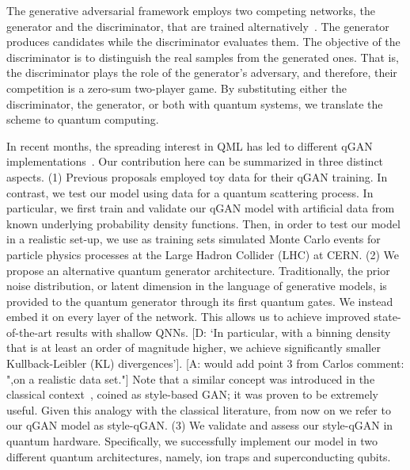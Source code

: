 \documentclass[twocolumn,preprintnumbers,superscriptaddress]{revtex4-2}
\newcommand{\commentAF}[1]{{\color{cyan} {[A: #1]}}}
\newcommand{\commentDMG}[1]{{\color{orange} {[D: #1]}}}
\begin{document}
The generative adversarial framework employs two competing networks, the generator and the discriminator, that are
trained alternatively~\cite{goodfellow2014generative}. The generator produces candidates
while the discriminator evaluates them. The objective of the discriminator is to
distinguish the real samples from the generated ones. That is, the discriminator
plays the role of the generator's adversary, and therefore, their competition is
a zero-sum two-player game. By substituting either the discriminator, the
generator, or both with quantum systems, we translate the scheme to quantum
computing.

In recent months, the spreading interest in QML has led to different qGAN
implementations~\cite{zoufal2019quantum, zeng2019learning, situ2020quantum, hu2019quantum, benedetti2019adversarial, romero2021variational, niu2021entangling}. Our contribution here can be summarized in three distinct aspects. (1) Previous proposals employed toy data for their qGAN training. In contrast, we test our model using data for a quantum scattering process. In particular, we first train and validate our qGAN model with artificial data from known underlying probability density functions. Then, in order to test our model in a realistic set-up, we use as training sets simulated Monte Carlo events for particle physics processes at the Large Hadron Collider (LHC) at CERN. (2) We propose an alternative quantum generator architecture. Traditionally, the prior noise distribution, or latent dimension in the language of generative models, is provided to the quantum generator through its first quantum gates. We instead embed it on every layer of the network. This allows us to achieve improved state-of-the-art results with shallow QNNs. \commentDMG{`In particular, with a binning density that is at least an order of magnitude higher, we achieve significantly smaller Kullback-Leibler (KL) divergences'}.\commentAF{would add point 3 from Carlos comment: ",on a realistic data set."} Note that a similar concept was introduced in the classical context~\cite{karras2019style}, coined as style-based GAN; it was proven to be extremely useful. Given this analogy with the classical literature, from now on we refer to our qGAN model as style-qGAN. (3) We validate and assess our style-qGAN in quantum hardware. Specifically, we successfully implement our model in two different quantum architectures, namely, ion traps and superconducting qubits.
\end{document}
